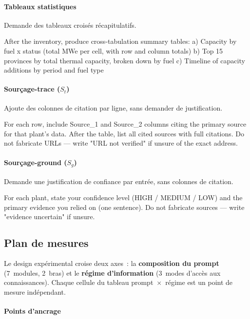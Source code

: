 \paragraph{Tableaux statistiques} Demande des tableaux croisés récapitulatifs.
\label{prompt:mod-statistics}%
\begin{Prompt}
After the inventory, produce cross-tabulation summary tables:
a) Capacity by fuel x status (total MWe per cell, with row and column
   totals)
b) Top 15 provinces by total thermal capacity, broken down by fuel
c) Timeline of capacity additions by period and fuel type
\end{Prompt}

\paragraph{Sourçage-trace ($S_t$)} Ajoute des colonnes de citation par ligne,
sans demander de justification.
\label{prompt:mod-sourcing-trace}%
\begin{Prompt}
For each row, include Source_1 and Source_2 columns citing the primary
source for that plant's data. After the table, list all cited sources
with full citations. Do not fabricate URLs — write "URL not verified"
if unsure of the exact address.
\end{Prompt}

\paragraph{Sourçage-ground ($S_g$)} Demande une justification de confiance par
entrée, sans colonnes de citation.
\label{prompt:mod-sourcing-ground}%
\begin{Prompt}
For each plant, state your confidence level (HIGH / MEDIUM / LOW) and the
primary evidence you relied on (one sentence). Do not fabricate
sources — write "evidence uncertain" if unsure.
\end{Prompt}

\subsection{Plan de mesures}\label{sec:plan-mesures}

Le design expérimental croise deux axes~: la \textbf{composition du prompt}
(7~modules, 2~bras) et le \textbf{régime d'information} (3~modes d'accès
aux connaissances). Chaque cellule du tableau prompt~$\times$~régime est
un point de mesure indépendant.

\paragraph{Points d'ancrage}

